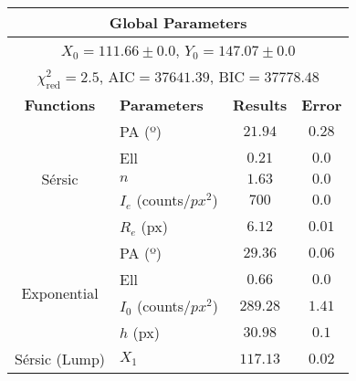

\begin{table}[!htb]
    \renewcommand{\thetable}{S1}
    \centering
    \begin{tabular}{|c|l|c|c|}
        \hline
        \multicolumn{4}{|c|}{\textbf{Global Parameters}}                                                            \\
        \hline
        \multicolumn{4}{|c|}{\(X_{0} = 111.66 \pm 0.0\), \(Y_{0} = 147.07 \pm 0.0\)}                                \\
        \hline
        \multicolumn{4}{|c|}{\(\chi^{2}_{\text{red}} = 2.5\), \(\text{AIC} = 37641.39\), \(\text{BIC} = 37778.48\)} \\
        \hline
        \textbf{Functions} & \textbf{Parameters}           & \textbf{Results} & \textbf{Error}                      \\
        \hline
        \multirow{5}{*}{Sérsic}
                           & PA (º)                        & \(21.94\)        & \(0.28\)                            \\
                           & Ell                           & \(0.21\)         & \(0.0\)                             \\
                           & \(n\)                         & \(1.63\)         & \(0.0\)                             \\
                           & \(I_{e}\) (counts/\(px^{2}\)) & \(700\)          & \(0.0\)                             \\
                           & \(R_{e}\) (px)                & \(6.12\)         & \(0.01\)                            \\
        \hline
        \multirow{4}{*}{Exponential}
                           & PA (º)                        & \(29.36\)        & \(0.06\)                            \\
                           & Ell                           & \(0.66\)         & \(0.0\)                             \\
                           & \(I_{0}\) (counts/\(px^{2}\)) & \(289.28\)       & \(1.41\)                            \\
                           & \(h\) (px)                    & \(30.98\)        & \(0.1\)                             \\
        \hline
        \multirow{5}{*}{Sérsic (Lump)}
                           & \(X_{1}\)                     & \(117.13\)       & \(0.02\)                            \\

\end{tabular}
\end{table}
